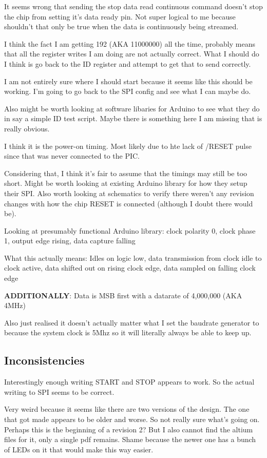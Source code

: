 It seems wrong that sending the stop data read continuous command doesn't stop the chip
from setting it's data ready pin. Not super logical to me because shouldn't that only be
true when the data is continuously being streamed.

I think the fact I am getting 192 (AKA 11000000) all the time, probably means that all the
register writes I am doing are not actually correct. What I should do I think is go back
to the ID register and attempt to get that to send correctly.

I am not entirely sure where I should start because it seems like this should be working.
I'm going to go back to the SPI config and see what I can maybe do.

Also might be worth looking at software libaries for Arduino to see what they do in say
a simple ID test script.
Maybe there is something here I am missing that is really obvious.

I think it is the power-on timing. Most likely due to hte lack of /RESET pulse since
that was never connected to the PIC.

Considering that, I think it's fair to assume that the timings may still be too short.
Might be worth looking at existing Arduino library for how they setup their SPI.
Also worth looking at schematics to verify there weren't any revision changes with how
the chip RESET is connected (although I doubt there would be).

Looking at presumably functional Arduino library:
clock polarity 0, clock phase 1, output edge rising, data capture falling

What this actually means:
Idles on logic low, data transmission from clock idle to clock active,
data shifted out on rising clock edge, data sampled on falling clock edge

\textbf{ADDITIONALLY}: Data is MSB first with a datarate of 4,000,000 (AKA 4MHz)

Also just realised it doesn't actually matter what I set the baudrate generator to because
the system clock is 5Mhz so it will literally always be able to keep up.


\subsection{Inconsistencies}
Interestingly enough writing START and STOP appears to work.
So the actual writing to SPI seems to be correct.

Very weird because it seems like there are two versions of the design.
The one that got made appears to be older and worse. So not really sure what's going on.
Perhaps this is the beginning of a revision 2?
But I also cannot find the altium files for it, only a single pdf remains.
Shame because the newer one has a bunch of LEDs on it that would make this way easier.

